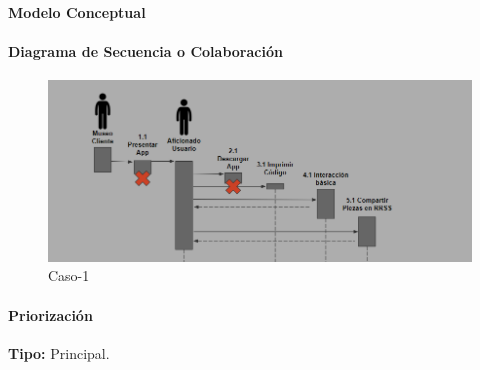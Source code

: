 \paragraph{Modelo Conceptual}


\paragraph{Diagrama de Secuencia o Colaboración}

\begin{figure}[H]
\centerline{\includegraphics[width=15cm]{imgs/CasoUso_6_2.PNG}}
\caption{Caso-1}
\label{fig}
\end{figure}

\paragraph{Priorización}
{\textbf {Tipo:}}
Principal.